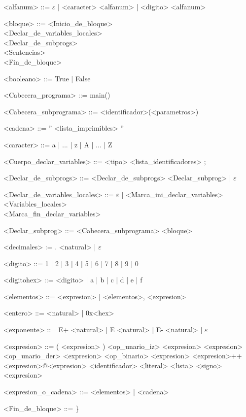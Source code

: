 \setlength{\grammarparsep}{4pt plus 1pt minus 1pt}

\begin{grammar}

<alfanum> ::= $\varepsilon$ | <caracter> <alfanum> | <digito> <alfanum>

<bloque> ::= <Inicio_de_bloque> \\
 <Declar_de_variables_locales> \\
 <Declar_de_subprogs> \\
 <Sentencias> \\
 <Fin_de_bloque>

<booleano> ::= True | False

<Cabecera_programa> ::= main()

<Cabecera_subprograma> ::= <identificador>(<parametros>)

<cadena> ::= '' <lista_imprimibles> ''

<caracter> ::= a | ... | z | A | ... | Z

<Cuerpo_declar_variables> ::= <tipo> <lista_identificadores> ;

<Declar_de_subprogs> ::= <Declar_de_subprogs> <Declar_subprog> | $\varepsilon$

<Declar_de_variables_locales> ::= $\varepsilon$ | <Marca_ini_declar_variables> \\
<Variables_locales> \\
<Marca_fin_declar_variables>

<Declar_subprog> ::= <Cabecera_subprograma> <bloque>

<decimales> := . <natural> | $\varepsilon$

<digito> ::= 1 | 2 | 3 | 4 | 5 | 6 | 7 | 8 | 9 | 0

<digitohex> ::= <digito> | a | b | c | d | e | f

<elementos> ::= <expresion> | <elementos>, <expresion>

<entero> ::= <natural> | 0x<hex>

<exponente> ::= E+ <natural> | E <natural> | E- <natural> | $\varepsilon$

<expresion> ::= ( <expresion> )
\alt <op_unario_iz> <expresion>
\alt <expresion> <op_unario_der>
\alt <expresion> <op_binario> <expresion>
\alt <expresion>++<expresion>@<expresion>
\alt <identificador>
\alt <literal>
\alt <lista>
\alt <signo> <expresion>

<expresion_o_cadena> ::= <elementos> | <cadena>

<Fin_de_bloque> ::= \}


\end{grammar}
